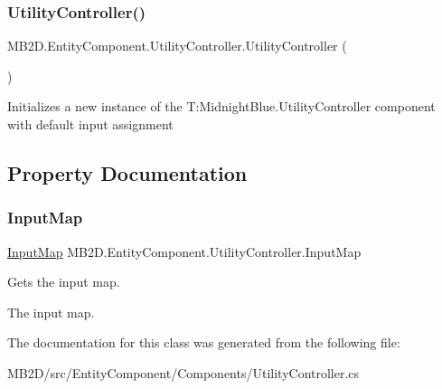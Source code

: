 \subsubsection{\texorpdfstring{Utility\+Controller()}{UtilityController()}}
{\footnotesize\ttfamily M\+B2\+D.\+Entity\+Component.\+Utility\+Controller.\+Utility\+Controller (\begin{DoxyParamCaption}{ }\end{DoxyParamCaption})\hspace{0.3cm}{\ttfamily [inline]}}



Initializes a new instance of the T\+:\+Midnight\+Blue.\+Utility\+Controller component with default input assignment 



\subsection{Property Documentation}
\hypertarget{class_m_b2_d_1_1_entity_component_1_1_utility_controller_a33211d8d414f44a6c320db8f73623882}{}\label{class_m_b2_d_1_1_entity_component_1_1_utility_controller_a33211d8d414f44a6c320db8f73623882} 
\subsubsection{\texorpdfstring{Input\+Map}{InputMap}}
{\footnotesize\ttfamily \hyperlink{class_m_b2_d_1_1_i_o_1_1_input_map}{Input\+Map} M\+B2\+D.\+Entity\+Component.\+Utility\+Controller.\+Input\+Map\hspace{0.3cm}{\ttfamily [get]}}



Gets the input map. 

The input map.

The documentation for this class was generated from the following file\+:\begin{DoxyCompactItemize}
\item 
M\+B2\+D/src/\+Entity\+Component/\+Components/Utility\+Controller.\+cs\end{DoxyCompactItemize}
